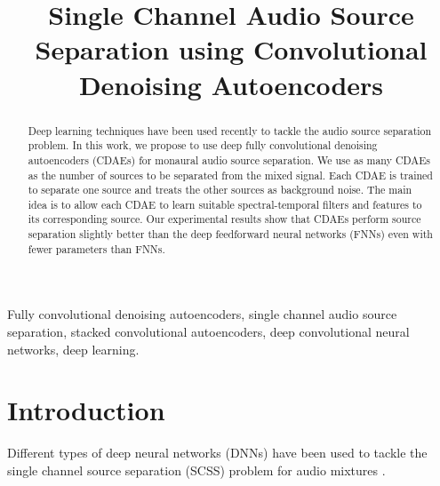 \documentclass{article}
\title{Single Channel Audio Source Separation using Convolutional Denoising Autoencoders}
\begin{document}
\ninept
%
\maketitle
%
\begin{abstract}
Deep learning techniques have been used recently to tackle the audio source separation problem. In this work, we propose to use deep fully convolutional denoising autoencoders (CDAEs) for monaural audio source separation. We use as many CDAEs as the number of sources to be separated from the mixed signal. Each CDAE is trained to separate one source and treats the other sources as background noise. The main idea is to allow each CDAE to learn suitable spectral-temporal filters and features to its corresponding source. Our experimental results show that CDAEs perform source separation slightly better than the deep feedforward neural networks (FNNs) even with fewer parameters than FNNs.
\end{abstract}
%
\begin{keywords}
Fully convolutional denoising autoencoders, single channel audio source separation, stacked convolutional autoencoders, deep convolutional neural networks, deep learning.
\end{keywords}
%
\section{Introduction}
\label{sec:intro}
Different types of deep neural networks (DNNs) have been used to tackle the single channel source separation (SCSS) problem for audio mixtures \cite{gabor1946}.
\end{document}

